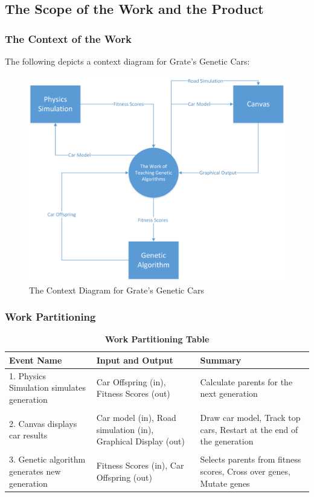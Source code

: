 \documentclass[12pt, titlepage]{article}
\begin{document}
\subsection{The Scope of the Work and the Product}

\subsubsection{The Context of the Work}
The following depicts a context diagram for Grate's Genetic Cars:

\begin{figure}[H]
  \includegraphics[scale=0.66]{ContextDiagram.png}
  \caption{The Context Diagram for Grate's Genetic Cars}
\end{figure}

\subsubsection{Work Partitioning}
\begin{table}[H]
\begin{tabularx}{\textwidth}{p{4cm}p{4cm}X}
\toprule {\bf Event Name} & {\bf Input and Output} & {\bf Summary}\\
\midrule
1. Physics Simulation simulates generation & Car Offspring (in), Fitness Scores 
(out) & Calculate parents for the next generation\\
& & \\
2. Canvas displays car results & Car model (in), Road simulation (in), Graphical 
Display (out) & Draw car model, Track top cars, Restart at the end of the 
generation\\
& & \\
3. Genetic algorithm generates new generation & Fitness Scores (in), Car 
Offspring (out) & Selects parents from fitness scores, Cross over genes, Mutate 
genes\\
\bottomrule
\end{tabularx}
\caption{\bf Work Partitioning Table}
\end{table}
\end{document}

